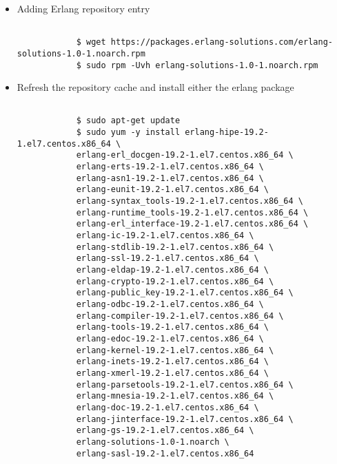 \begin{itemize}

	\item Adding Erlang repository entry
	
		
		\renewcommand{\lstlistingname}{Código}             
		\begin{lstlisting}[Adding Erlang repository entry, label=add_erlang_repo] 

			$ wget https://packages.erlang-solutions.com/erlang-solutions-1.0-1.noarch.rpm
			$ sudo rpm -Uvh erlang-solutions-1.0-1.noarch.rpm

		\end{lstlisting}


	\item Refresh the repository cache and install either the erlang package
	
		\renewcommand{\lstlistingname}{Código}             
		\begin{lstlisting}[Adding Erlang repository entry, label=install_erlang] 

			$ sudo apt-get update
			$ sudo yum -y install erlang-hipe-19.2-1.el7.centos.x86_64 \
			erlang-erl_docgen-19.2-1.el7.centos.x86_64 \
			erlang-erts-19.2-1.el7.centos.x86_64 \
			erlang-asn1-19.2-1.el7.centos.x86_64 \
			erlang-eunit-19.2-1.el7.centos.x86_64 \
			erlang-syntax_tools-19.2-1.el7.centos.x86_64 \
			erlang-runtime_tools-19.2-1.el7.centos.x86_64 \
			erlang-erl_interface-19.2-1.el7.centos.x86_64 \
			erlang-ic-19.2-1.el7.centos.x86_64 \
			erlang-stdlib-19.2-1.el7.centos.x86_64 \
			erlang-ssl-19.2-1.el7.centos.x86_64 \
			erlang-eldap-19.2-1.el7.centos.x86_64 \
			erlang-crypto-19.2-1.el7.centos.x86_64 \
			erlang-public_key-19.2-1.el7.centos.x86_64 \
			erlang-odbc-19.2-1.el7.centos.x86_64 \
			erlang-compiler-19.2-1.el7.centos.x86_64 \
			erlang-tools-19.2-1.el7.centos.x86_64 \
			erlang-edoc-19.2-1.el7.centos.x86_64 \
			erlang-kernel-19.2-1.el7.centos.x86_64 \
			erlang-inets-19.2-1.el7.centos.x86_64 \
			erlang-xmerl-19.2-1.el7.centos.x86_64 \
			erlang-parsetools-19.2-1.el7.centos.x86_64 \
			erlang-mnesia-19.2-1.el7.centos.x86_64 \
			erlang-doc-19.2-1.el7.centos.x86_64 \
			erlang-jinterface-19.2-1.el7.centos.x86_64 \
			erlang-gs-19.2-1.el7.centos.x86_64 \
			erlang-solutions-1.0-1.noarch \
			erlang-sasl-19.2-1.el7.centos.x86_64
			

\end{lstlisting}
\end{itemize}
